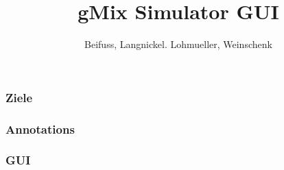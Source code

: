 \documentclass[]{beamer}
\title{gMix Simulator GUI}
\author{Beifuss, Langnickel. Lohmueller, Weinschenk}
\begin{document}
    \frame{\titlepage}
    \frame{\tableofcontents}

\begin{frame}[t]\frametitle{Ziele}
        
\end{frame}

\begin{frame}[t]\frametitle{Annotations}
    
\end{frame}

\begin{frame}[t]\frametitle{GUI}

\end{frame}
\end{document}
